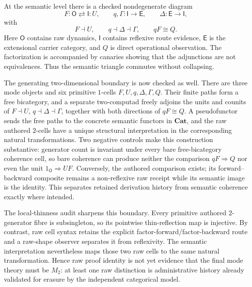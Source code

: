 \documentclass[11pt]{article}
\theoremstyle{definition}
\theoremstyle{remark}
\begin{document}
At the semantic level there is a checked nondegenerate diagram
\[
  F : \mathsf O \rightleftarrows \mathsf I : U,
  \qquad q,\Gamma : \mathsf I \longrightarrow \mathsf E,
  \qquad \Delta : \mathsf E \longrightarrow \mathsf I,
\]
with
\[
  F\dashv U,
  \qquad q\dashv\Delta\dashv\Gamma,
  \qquad qF \cong Q.
\]
Here $\mathsf O$ contains raw dynamics, $\mathsf I$ contains reflexive route
evidence, $\mathsf E$ is the extensional carrier category, and $Q$ is direct
operational observation.  The factorization is accompanied by canaries showing
that the adjunctions are not equivalences.  Thus the semantic triangle commutes
without collapsing.

The generating two-dimensional boundary is now checked as well.  There are
three mode objects and six primitive $1$-cells
$F,U,q,\Delta,\Gamma,Q$.  Their finite paths form a free bicategory, and a
separate two-computad freely adjoins the units and counits of
$F\dashv U$, $q\dashv\Delta\dashv\Gamma$, together with both directions of
$qF\cong Q$.  A pseudofunctor sends the free paths to the concrete semantic
functors in $\mathbf{Cat}$, and the raw authored $2$-cells have a unique
structural interpretation in the corresponding natural transformations.
Two negative controls make this construction substantive: generator count is
invariant under every bare free-bicategory coherence cell, so bare coherence
can produce neither the comparison $qF\Rightarrow Q$ nor even the unit
$1_{\mathsf O}\Rightarrow UF$.  Conversely, the authored comparison exists;
its forward--backward composite remains a non-reflexive raw receipt while its
semantic image is the identity.  This separates retained derivation history
from semantic coherence exactly where intended.

The local-thinness audit sharpens this boundary.  Every primitive authored
$2$-generator fibre is subsingleton, so its pointwise thin-reflection map is
injective.  By contrast, raw cell syntax retains the explicit
factor-forward/factor-backward route and a raw-shape observer separates it from
reflexivity.  The semantic interpretation nevertheless maps those two raw
cells to the same natural transformation.  Hence raw proof identity is not yet
evidence that the final mode theory must be $M_2$: at least one raw distinction
is administrative history already validated for erasure by the independent
categorical model.
\end{document}
